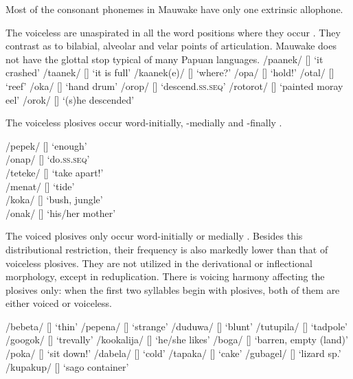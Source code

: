 Most of the consonant phonemes in Mauwake have only one extrinsic allophone. 

The voiceless  are unaspirated in all the word positions where they occur . They contrast as to bilabial, alveolar and velar points of articulation. Mauwake does not have the glottal stop typical of many Papuan languages. 
\renewcommand{\exfont}{\upshape}
\renewcommand{\eachwordone}{\upshape}
\ea
\label{ex:2:voicelessplosives}
\ea
/{paanek}/  []  `it crashed'
\ex
/{taanek}/  []  `it is full'
\ex
/{kaanek}({e})/  []  `where?'
\ex
/{opa}/  []  `hold!'
\ex
/{otal}/  []  `reef'
\ex
/{oka}/  []  `hand drum'
\ex
/{orop}/  []  `descend.\textsc{ss.seq}'
\ex
/{rotorot}/  []  `painted moray eel'
\ex
/{orok}/  []  `(s)he descended'
\z
\z


The voiceless plosives occur word-initially, -medially and -finally .

\ea\label{ex:2:positionofvoicelessplosives}
\ea
/{pepek}/    []    `enough'\\
\ex
/{onap}/    []    `do.\textsc{ss.seq}'\\
\ex
/{teteke}/   []    `take apart!'\\
\ex
/{menat}/    []    `tide'\\
\ex
/{koka}/    []   `bush, jungle'\\
\ex
/{onak}/    []   `his/her mother' \\
\z
\z

The voiced plosives only occur word-initially or medially . Besides this distributional restriction, their frequency is also markedly lower than that of voiceless plosives. They are not utilized in the derivational or inflectional morphology, except in reduplication. There is voicing harmony affecting the plosives only: when the first two syllables begin with plosives, both of them are either voiced or voiceless. 


\ea
\label{tab:2:voicedplosives}
\ea
/bebeta/  []  `thin'
\ex
/pepena/  []  `strange'
\ex
/duduwa/  []  `blunt'
\ex
/tutupila/  []  `tadpole'
\ex
/googok/  []  `trevally'
\ex
/kookalija/  []  `he/she likes'
\ex
/boga/  []  `barren, empty (land)'
\ex
/poka/  []  `sit down!'
\ex
/dabela/  []  `cold'
\ex
/tapaka/  []  `cake'
\ex
/gubagel/  []  `lizard sp.' 
\ex
/kupakup/  []  `sago container'
\z
\z

